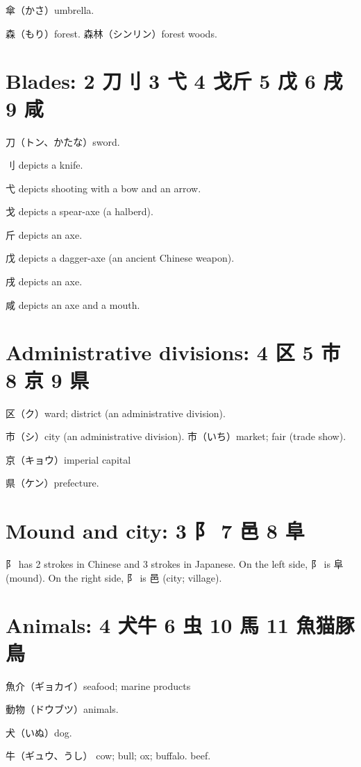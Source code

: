 傘（かさ）umbrella.

森（もり）forest.
森林（シンリン）forest woods.

\section{Blades: 2 刀刂 3 弋 4 戈斤 5 戊 6 戌 9 咸}

刀（トン、かたな）sword.

刂 depicts a knife.

弋 depicts shooting with a bow and an arrow.

戈 depicts a spear-axe (a halberd).

斤 depicts an axe.

戊 depicts a dagger-axe (an ancient Chinese weapon).

戌 depicts an axe.

咸 depicts an axe and a mouth.

\section{Administrative divisions: 4 区 5 市 8 京 9 県}


区（ク）ward; district (an administrative division).

市（シ）city (an administrative division).
市（いち）market; fair (trade show).

京（キョウ）imperial capital

県（ケン）prefecture.

\section{Mound and city: 3 阝 7 邑 8 阜}

阝 has 2 strokes in Chinese and 3 strokes in Japanese.
On the left side, 阝 is 阜 (mound).
On the right side, 阝 is 邑 (city; village).

\section{Animals: 4 犬牛 6 虫 10 馬 11 魚猫豚鳥}

魚介（ギョカイ）seafood; marine products

動物（ドウブツ）animals.

犬（いぬ）dog.

牛（ギュウ、うし）
cow; bull; ox; buffalo.
beef.

